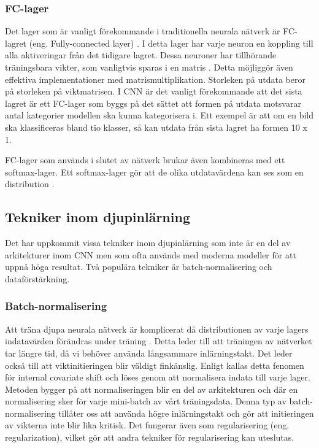 \documentclass[]{kththesis}
\begin{document}
\subsubsection{FC-lager}
Det lager som är vanligt förekommande i traditionella neurala nätverk är FC-lagret (eng. Fully-connected layer) \parencite{krizhevsky2012imagenet}. I detta lager har varje neuron en koppling till alla aktiveringar från det tidigare lagret. Dessa neuroner har tillhörande träningsbara vikter, som vanligtvis sparas i en matris \parencite{Goodfellow-et-al-2016}. Detta möjliggör även effektiva implementationer med matrismultiplikation. Storleken på utdata beror på storleken på viktmatrisen. I CNN är det vanligt förekommande att det sista lagret är ett FC-lager som byggs på det sättet att formen på utdata motsvarar antal kategorier modellen ska kunna kategorisera i. Ett exempel är att om en bild ska klassificeras bland tio klasser, så kan utdata från sista lagret ha formen 10 x 1.

FC-lager som används i slutet av nätverk brukar även kombineras med ett softmax-lager. Ett softmax-lager gör att de olika utdatavärdena kan ses som en distribution \parencite{Goodfellow-et-al-2016}.

\subsection{Tekniker inom djupinlärning}
Det har uppkommit vissa tekniker inom djupinlärning som inte är en del av arkitekturer inom CNN men som ofta används med moderna modeller för att uppnå höga resultat. Två populära tekniker är batch-normalisering och dataförstärkning.

\subsubsection{Batch-normalisering}
Att träna djupa neurala nätverk är komplicerat då distributionen av varje lagers indatavärden förändras under träning \parencite{ioffe2015batch}. Detta leder till att träningen av nätverket tar längre tid, då vi behöver använda långsammare inlärningstakt. Det leder också till att viktinitieringen blir väldigt finkänslig. Enligt \textcite{ioffe2015batch} kallas detta fenomen för internal covariate shift och löses genom att normalisera indata till varje lager. Metoden bygger på att normaliseringen blir en del av arkitekturen och där en normalisering sker för varje mini-batch av vårt träningsdata. Denna typ av batch-normalisering tillåter oss att använda högre inlärningstakt och gör att initieringen av vikterna inte blir lika kritisk. Det fungerar även som regularisering (eng. regularization), vilket gör att andra tekniker för regularisering kan uteslutas.
\end{document}
